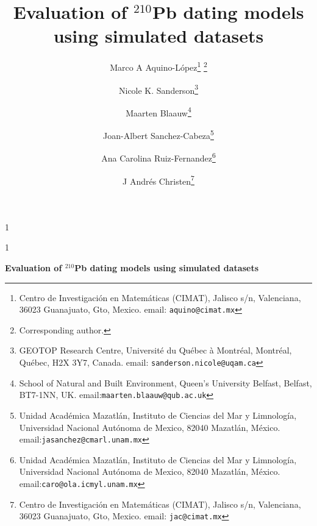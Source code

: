 \documentclass [10pt] {article}
\date{ }
\newcommand{\blind}{1}
\newcommand{\papertitle}{
	Evaluation of $^{210}$Pb dating models using simulated datasets
}
\begin{document}
	\def\spacingset#1{\renewcommand{\baselinestretch}%
		{#1}\small\normalsize} \spacingset{1}
	\blind
	{
		\title{\textbf{\papertitle}}

		\author{Marco A Aquino-L\'opez\thanks{
				Centro de Investigaci\'on en Matem\'aticas (CIMAT),
				Jalisco s/n, Valenciana, 36023 Guanajuato, Gto, Mexico.
				email: \texttt{aquino@cimat.mx} } \thanks{Corresponding author.}
					\and
			Nicole K. Sanderson\thanks{
				GEOTOP Research Centre, Université du Québec à Montréal, 
				Montréal, Québec, H2X 3Y7, Canada. 
				email: \texttt{sanderson.nicole@uqam.ca}}
					\and
			Maarten Blaauw\thanks{School of Natural and Built Environment,
				Queen's University Belfast,
				Belfast, BT7-1NN, UK.
				email:\texttt{maarten.blaauw@qub.ac.uk}  }
					\and
			Joan-Albert Sanchez-Cabeza\thanks{
				Unidad Acad\'emica Mazatl\'an, 
				Instituto de Ciencias del Mar y Limnolog\'ia, 
				Universidad Nacional Aut\'onoma de Mexico, 
				82040 Mazatl\'an, M\'exico.
				email:\texttt{jasanchez@cmarl.unam.mx}} 
					\and
			Ana Carolina Ruiz-Fernandez\thanks{
				Unidad Acad\'emica Mazatl\'an, 
				Instituto de Ciencias del Mar y Limnolog\'ia, 
				Universidad Nacional Aut\'onoma de Mexico, 
				82040 Mazatl\'an, M\'exico.
				email:\texttt{caro@ola.icmyl.unam.mx}} 
					\and
			J Andr\'es Christen\thanks{
				Centro de Investigaci\'on en Matem\'aticas (CIMAT),
				Jalisco s/n, Valenciana, 36023 Guanajuato, Gto, Mexico.
				email: \texttt{jac@cimat.mx}  }
			}
		\maketitle
	} \fi

	\blind
	{
		\bigskip
		\bigskip
		\bigskip
		\begin{center}
			{\LARGE\bf \papertitle}
		\end{center}
		\medskip
	} \fi
\bigskip
\end{document}
